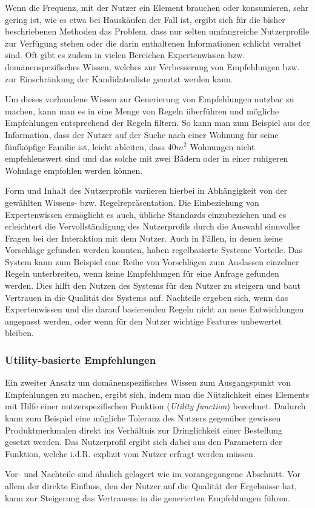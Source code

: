 Wenn die Frequenz, mit der Nutzer ein Element brauchen oder konsumieren, sehr gering ist, wie es etwa bei Hauskäufen der Fall ist, ergibt sich für die bisher beschriebenen Methoden das Problem, dass nur selten umfangreiche Nutzerprofile zur Verfügung stehen oder die darin enthaltenen Informationen schlicht veraltet sind. Oft gibt es zudem in vielen Bereichen Expertenwissen bzw. domänenspezifisches Wissen, welches zur Verbesserung von Empfehlungen bzw. zur Einschränkung der Kandidatenliste genutzt werden kann.

Um dieses vorhandene Wissen zur Generierung von Empfehlungen nutzbar zu machen, kann man es in eine Menge von Regeln überführen und mögliche Empfehlungen entsprechend der Regeln filtern. So kann man zum Beispiel aus der Information, dass der Nutzer auf der Suche nach einer Wohnung für seine fünfköpfige Familie ist, leicht ableiten, dass 40$m^{2}$ Wohnungen nicht empfehlenswert sind und das solche mit zwei Bädern oder in einer ruhigeren Wohnlage empfohlen werden können.

Form und Inhalt des Nutzerprofils variieren hierbei in Abhängigkeit von der gewählten Wissens- bzw. Regelrepräsentation. Die Einbeziehung von Expertenwissen ermöglicht es auch, übliche Standards einzubeziehen und es erleichtert die Vervollständigung des Nutzerprofils durch die Auswahl sinnvoller Fragen bei der Interaktion mit dem Nutzer. Auch in Fällen, in denen keine Vorschläge gefunden werden konnten, haben regelbasierte Systeme Vorteile. Das System kann zum Beispiel eine Reihe von Vorschlägen zum Auslassen einzelner Regeln unterbreiten, wenn keine Empfehlungen für eine Anfrage gefunden werden. Dies hilft den Nutzen des Systems für den Nutzer zu steigern und baut Vertrauen in die Qualität des Systems auf. Nachteile ergeben sich, wenn das Expertenwissen und die darauf basierenden Regeln nicht an neue Entwicklungen angepasst werden, oder wenn für den Nutzer wichtige Features unbewertet bleiben. \citep[Kap. 4]{rs}

\subsubsection{Utility-basierte Empfehlungen}

Ein zweiter Ansatz um domänenspezifisches Wissen zum Ausgangspunkt von Empfehlungen zu machen, ergibt sich, indem man die Nützlichkeit eines Elements mit Hilfe einer nutzerspezifischen Funktion (\textit{Utility function}) berechnet. Dadurch kann zum Beispiel eine mögliche Toleranz des Nutzers gegenüber gewissen Produktmerkmalen direkt ins Verhältnis zur Dringlichkeit einer Bestellung gesetzt werden. Das Nutzerprofil ergibt sich dabei aus den Parametern der Funktion, welche i.d.R. explizit vom Nutzer erfragt werden müssen.

Vor- und Nachteile sind ähnlich gelagert wie im vorangegangene Abschnitt. Vor allem der direkte Einfluss, den der Nutzer auf die Qualität der Ergebnisse hat, kann zur Steigerung das Vertrauens in die generierten Empfehlungen führen.  \citep[Kap. 1]{hb} \citep{Burke:2002:HRS:586321.586352, hb_20}





